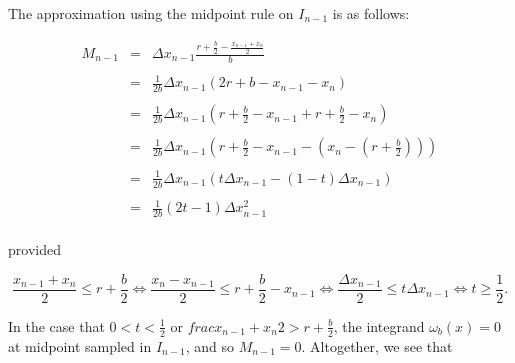 \documentclass{article}
\begin{document}
\noindent
The approximation using the midpoint rule on $I_{n-1}$ is as follows:

\[
\begin{array}{rcl}
    M_{n-1} &=& \displaystyle
                \Delta x_{n-1}
                \frac{r + \frac{b}{2} - \frac{x_{n-1} + x_n}{2}}{b}
                \\
            & &	\\
            &=& \displaystyle
                \frac{1}{2b}
                \Delta x_{n-1}
                \left(
                2r + b - x_{n-1} - x_n
                \right)
                \\
            & &	\\
            &=& \displaystyle
                \frac{1}{2b}
                \Delta x_{n-1}
                \left(
                r + \frac{b}{2} - x_{n-1}
                +
                r + \frac{b}{2} - x_n
                \right)
                \\
            & &	\\
            &=& \displaystyle
                \frac{1}{2b}
                \Delta x_{n-1}
                \left(
                    r + \frac{b}{2} - x_{n-1}
                    -
                    \left(
                        x_n
                        -
                        \left(
                            r + \frac{b}{2}
                        \right)
                    \right)
                \right)
                \\
            & &	\\
            &=& \displaystyle
                \frac{1}{2b}
                \Delta x_{n-1}
                (
                    t \Delta x_{n-1}
                    -
                    (1 - t) \Delta x_{n-1}
                )
                \\
            & &	\\
            &=& \displaystyle
                \frac{1}{2b}
                (2t - 1)\Delta x_{n-1}^2
                \\
\end{array}
\]

\noindent
provided

\[
    \frac{x_{n-1} + x_n}{2} \leq r + \frac{b}{2}
    \iff
    \frac{x_n - x_{n-1}}{2} \leq r + \frac{b}{2} - x_{n-1}
    \iff
    \frac{\Delta x_{n-1}}{2} \leq t \Delta x_{n-1}
    \iff
    t \geq \frac{1}{2}.
\]

\noindent
In the case that $0 < t < \frac{1}{2}$ or $frac{x_{n-1} + x_n}{2} > r + \frac{b}{2}$, the integrand $\omega_b(x) = 0$ at midpoint sampled in $I_{n-1}$, and so $M_{n-1} = 0$. Altogether, we see that
\end{document}
